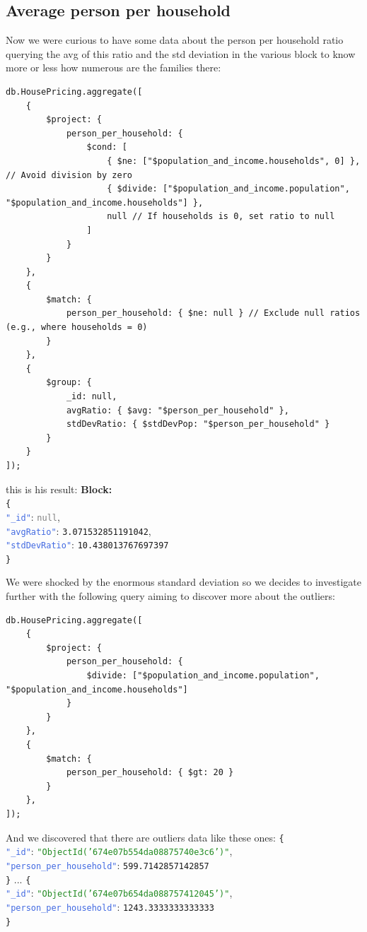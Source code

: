 \documentclass{Configuration_Files/PoliMi3i_thesis}
\newcommand{\jsonkey}[1]{\textcolor{RoyalBlue}{\texttt{"#1"}}}
\newcommand{\jsonstring}[1]{\textcolor{ForestGreen}{\texttt{"#1"}}}
\newcommand{\jsonnumber}[1]{\textcolor{BrickRed}{\texttt{#1}}}
\newcommand{\jsonnull}[1]{\textcolor{Gray}{\texttt{#1}}}
\begin{document}
\subsection{Average person per household}
 Now we were curious to have some data about the person per household ratio querying the avg of this ratio and the std deviation in the various block to know more or less how numerous are the families there:
\begin{lstlisting}[language=MongoDB]
db.HousePricing.aggregate([
    {
        $project: {
            person_per_household: {
                $cond: [
                    { $ne: ["$population_and_income.households", 0] }, // Avoid division by zero
                    { $divide: ["$population_and_income.population", "$population_and_income.households"] },
                    null // If households is 0, set ratio to null
                ]
            }
        }
    },
    {
        $match: {
            person_per_household: { $ne: null } // Exclude null ratios (e.g., where households = 0)
        }
    },
    {
        $group: {
            _id: null,
            avgRatio: { $avg: "$person_per_household" },
            stdDevRatio: { $stdDevPop: "$person_per_household" }
        }
    }
]);
\end{lstlisting}
this is his result:
\textbf{Block:}\\
\noindent
\texttt{\{} \\
\jsonkey{\_id}: \jsonnull{null}, \\
\jsonkey{avgRatio}: \jsonnumber{3.071532851191042}, \\
\jsonkey{stdDevRatio}: \jsonnumber{10.438013767697397} \\
\texttt{\}}

We were shocked by the enormous standard deviation so we decides to investigate further with the following query aiming to discover more about the outliers:
\begin{lstlisting}[language=MongoDB]
db.HousePricing.aggregate([
    {
        $project: {
            person_per_household: {
                $divide: ["$population_and_income.population", "$population_and_income.households"]
            }
        }
    },
    {
        $match: {
            person_per_household: { $gt: 20 }
        }
    },
]);
\end{lstlisting}

And we discovered that there are outliers data like these ones:
\noindent
\texttt{\{} \\
\jsonkey{\_id}: \jsonstring{ObjectId('674e07b554da08875740e3c6')}, \\
\jsonkey{person\_per\_household}: \jsonnumber{599.7142857142857} \\
\texttt{\}}
... 
\noindent
\texttt{\{} \\
\jsonkey{\_id}: \jsonstring{ObjectId('674e07b654da088757412045')}, \\
\jsonkey{person\_per\_household}: \jsonnumber{1243.3333333333333} \\
\texttt{\}}
\end{document}
